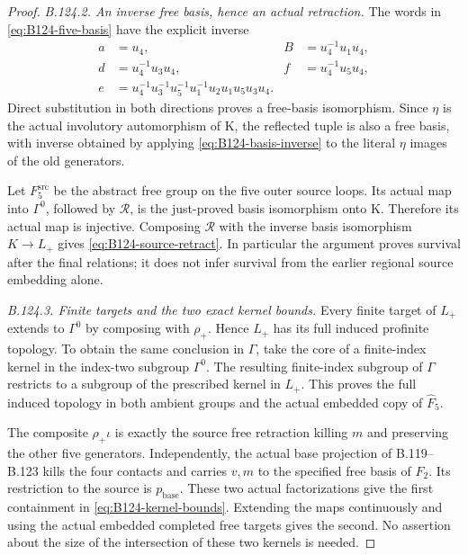 \begin{proof}
\emph{B.124.2. An inverse free basis, hence an actual retraction.}
The words in \eqref{eq:B124-five-basis} have the explicit inverse
\begin{equation}\label{eq:B124-basis-inverse}
 \begin{aligned}
 a&=u_4,& B&=u_4^{-1}u_1u_4,\\
 d&=u_4^{-1}u_3u_4,& f&=u_4^{-1}u_5u_4,\\
 e&=u_4^{-1}u_3^{-1}u_5^{-1}u_1^{-1}
       u_2u_1u_5u_3u_4.
 \end{aligned}
\end{equation}
Direct substitution in both directions proves a free-basis
isomorphism. Since $\eta$ is the actual involutory automorphism
of K, the reflected tuple is also a free basis, with inverse
obtained by applying \eqref{eq:B124-basis-inverse} to the literal
$\eta$ images of the old generators.

Let $F_5^{\mathrm{src}}$ be the abstract free group on the five outer
source loops. Its actual map into $\Gamma^0$, followed by
$\mathcal R$, is the just-proved basis isomorphism onto K.
Therefore its actual map is injective. Composing $\mathcal R$
with the inverse basis isomorphism $K\to L_+$ gives
\eqref{eq:B124-source-retract}. In particular the argument proves
survival after the final relations; it does not infer survival
from the earlier regional source embedding alone.

\emph{B.124.3. Finite targets and the two exact kernel bounds.}
Every finite target of $L_+$ extends to $\Gamma^0$ by composing
with $\rho_+$. Hence $L_+$ has its full induced profinite topology.
To obtain the same conclusion in $\Gamma$, take the core of a
finite-index kernel in the index-two subgroup $\Gamma^0$.
The resulting finite-index subgroup of $\Gamma$ restricts to a
subgroup of the prescribed kernel in $L_+$. This proves the full
induced topology in both ambient groups and the actual embedded
copy of $\widehat F_5$.

The composite $\rho_+\iota$ is exactly the source free retraction
killing $m$ and preserving the other five generators. Independently,
the actual base projection of B.119--B.123 kills the four contacts
and carries $v,m$ to the specified free basis of $F_2$. Its
restriction to the source is $p_{\mathrm{base}}$. These two actual
factorizations give the first containment in
\eqref{eq:B124-kernel-bounds}. Extending the maps continuously and
using the actual embedded completed free targets gives the second.
No assertion about the size of the intersection of these two
kernels is needed.


\end{proof}
